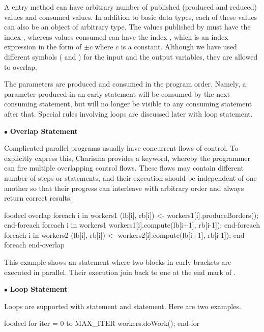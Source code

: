 A entry method can have arbitrary number of published (produced and reduced)
values and consumed values. In addition to basic data types, each of these
values can also be an object of arbitrary type. The values published by
 must have the index , whereas values consumed can have the
index , which is an index expression in the form of $\pm c$
where $c$ is a constant. Although we have used different symbols ( and
) for the input and the output variables, they are allowed to overlap. 

The parameters are produced and consumed in the program order. Namely, a
parameter produced in an early statement will be consumed by the next consuming
statement, but will no longer be visible to any consuming statement after that.
Special rules involving loops are discussed later with loop statement.

$\bullet$ {\bf Overlap Statement}

Complicated parallel programs usually have concurrent flows of control. To
explicitly express this, Charisma provides a  keyword, whereby the
programmer can fire multiple overlapping control flows. These flows may contain
different number of steps or statements, and their execution should be
independent of one another so that their progress can interleave with arbitrary
order and always return correct results. 

\begin{SaveVerbatim}{foodecl}
  overlap
  {
    foreach i in workers1
      (lb[i], rb[i]) <- workers1[i].produceBorders();
    end-foreach
    foreach i in workers1
      workers1[i].compute(lb[i+1], rb[i-1]);
    end-foreach
  }
  {
    foreach i in workers2
      (lb[i], rb[i]) <- workers2[i].compute(lb[i+1], rb[i-1]);
    end-foreach
  }
  end-overlap
\end{SaveVerbatim}
\vspace{0.1in}
\vspace{0.1in}

This example shows an  statement where two blocks in curly
brackets are executed in parallel. Their execution join back to one at the end
mark of . 

$\bullet$ {\bf Loop Statement}

Loops are supported with  statement and  statement. Here
are two examples.
\begin{SaveVerbatim}{foodecl}
  for iter = 0 to MAX_ITER
     workers.doWork();
  end-for
\end{SaveVerbatim}
\vspace{0.1in}
\vspace{0.1in}
  
